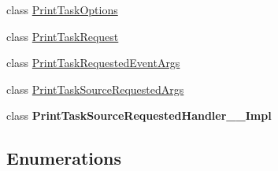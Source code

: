 \begin{DoxyCompactItemize}
\item 
class \hyperlink{class_windows_1_1_graphics_1_1_printing_1_1_print_task_options}{Print\+Task\+Options}
\item 
class \hyperlink{class_windows_1_1_graphics_1_1_printing_1_1_print_task_request}{Print\+Task\+Request}
\item 
class \hyperlink{class_windows_1_1_graphics_1_1_printing_1_1_print_task_requested_event_args}{Print\+Task\+Requested\+Event\+Args}
\item 
class \hyperlink{class_windows_1_1_graphics_1_1_printing_1_1_print_task_source_requested_args}{Print\+Task\+Source\+Requested\+Args}
\item 
class {\bfseries Print\+Task\+Source\+Requested\+Handler\+\_\+\+\_\+\+Impl}
\end{DoxyCompactItemize}
\subsection*{Enumerations}
